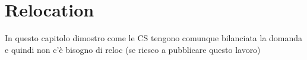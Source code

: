 
\chapter{Relocation}
\label{chap:9_relocation}
	\graphicspath{{Chapter9/}}
In questo capitolo dimostro come le CS tengono comunque bilanciata la domanda e quindi non c'è bisogno di reloc (se riesco a pubblicare questo lavoro)




